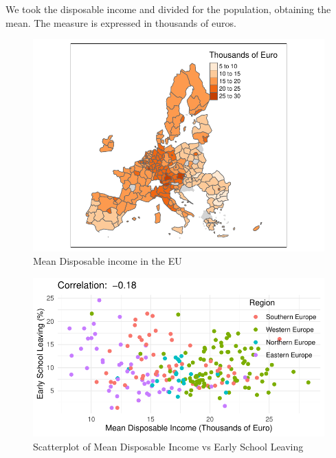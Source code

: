 \documentclass[
  letterpaper,
  DIV=11,
  numbers=noendperiod,
  abstract]{scrartcl}
\begin{document}
We took the disposable income and divided for the population, obtaining
the mean. The measure is expressed in thousands of euros.

\begin{figure}[H]

{\centering \includegraphics[width=1\textwidth,height=\textheight]{report_files/figure-pdf/mappa income-1.pdf}

}

\caption{Mean Disposable income in the EU}

\end{figure}%

\begin{figure}[H]

{\centering \includegraphics[width=1\textwidth,height=\textheight]{report_files/figure-pdf/scatter income-1.pdf}

}

\caption{Scatterplot of Mean Disposable Income vs Early School Leaving}

\end{figure}%
\end{document}
